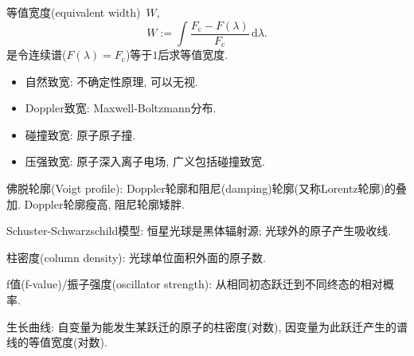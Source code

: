 等值宽度(equivalent width)~$W$,
\begin{equation*}
    W:=\int\frac{F_\text{c}-F(\lambda)}{F_\text{c}}\,\mathrm{d}\lambda.
\end{equation*}
是令连续谱($F(\lambda)=F_\text{c}$)等于$1$后求等值宽度.

\begin{itemize}
    \item 自然致宽: 不确定性原理, 可以无视.
    \item Doppler致宽: Maxwell-Boltzmann分布.
    \item 碰撞致宽: 原子原子撞.
    \item 压强致宽: 原子深入离子电场, 广义包括碰撞致宽.
\end{itemize}
佛脱轮廓(Voigt profile): Doppler轮廓和阻尼(damping)轮廓(又称Lorentz轮廓)的叠加. Doppler轮廓瘦高, 阻尼轮廓矮胖.

Schuster-Schwarzschild模型: 恒星光球是黑体辐射源; 光球外的原子产生吸收线.

柱密度(column density): 光球单位面积外面的原子数.

f值(f-value)/振子强度(oscillator strength): 从相同初态跃迁到不同终态的相对概率.

生长曲线: 自变量为能发生某跃迁的原子的柱密度(对数), 因变量为此跃迁产生的谱线的等值宽度(对数).
